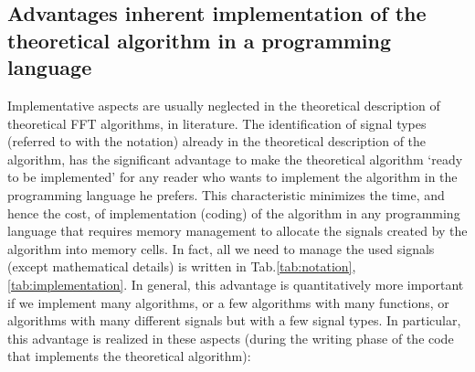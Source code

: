 \documentclass[a4paper,10pt]{article}
\begin{document}
\subsection{Advantages inherent implementation of the theoretical algorithm in a programming language}

Implementative aspects are usually neglected in the theoretical description of theoretical FFT algorithms, in literature.
The identification of signal types (referred to with the notation) already in the theoretical description of the algorithm, has the significant advantage to make the theoretical algorithm `ready to be implemented' for any reader who wants to implement the algorithm in the programming language he prefers.
This characteristic minimizes the time, and hence the cost, of implementation (coding) of the algorithm in any programming language that requires memory management to allocate the signals created by the algorithm into memory cells. 
In fact, all we need to manage the used signals (except mathematical details) is written in Tab.\ref{tab:notation}, \ref{tab:implementation}.
In general, this advantage is quantitatively more important if we implement many algorithms, or a few algorithms with many functions, or algorithms with many different signals but with a few signal types.
In particular, this advantage is realized in these aspects (during the writing phase of the code that implements the theoretical algorithm):
\end{document}
